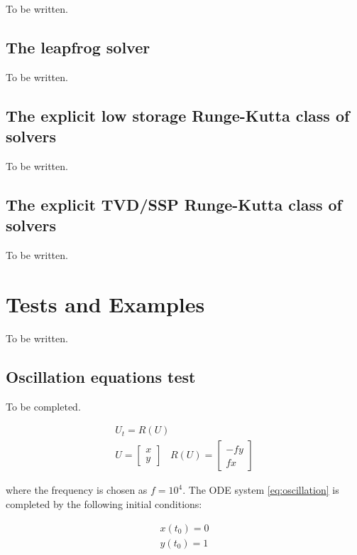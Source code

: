 \documentclass[pdftex,preprint,3p,times,numbers]{elsarticle}
\begin{document}
{\color{red} To be written.}

\subsection{The leapfrog solver}

{\color{red} To be written.}

\subsection{The explicit low storage Runge-Kutta class of solvers}

{\color{red} To be written.}

\subsection{The explicit TVD/SSP Runge-Kutta class of solvers}

{\color{red} To be written.}

\section{Tests and Examples}\label{sec:Tests}

{\color{red} To be written.}

\clearpage

\subsection{Oscillation equations test}

{\color{red} To be completed.}

\begin{equation}
\begin{matrix}
U_t = R(U)  \\
U = \begin{bmatrix}
x \\
y
\end{bmatrix}\;\;\;
R(U) = \begin{bmatrix}
-f y \\
f x
\end{bmatrix}
\end{matrix}
\label{eq:oscillation}
\end{equation}

where the frequency is chosen as $f=10^4$. The ODE system \ref{eq:oscillation} is completed by the following initial conditions:

\begin{equation}
\begin{matrix}
  x(t_0) = 0 \\
  y(t_0) = 1
\end{matrix}
\label{eq:oscillation-ic}
\end{equation}
\end{document}
